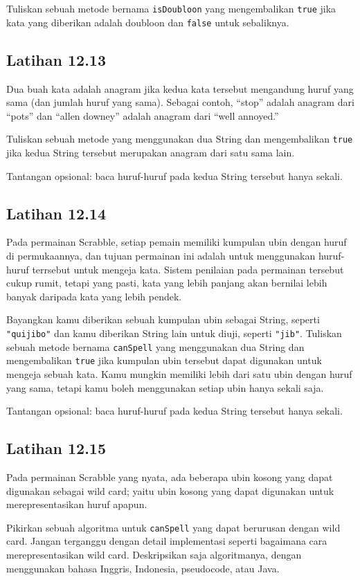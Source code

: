 Tuliskan sebuah metode bernama {\tt isDoubloon} yang mengembalikan {\tt true}
jika kata yang diberikan adalah doubloon dan {\tt false} untuk sebaliknya.



\subsection{Latihan 12.13}
Dua buah kata adalah anagram jika kedua kata tersebut mengandung huruf yang sama (dan jumlah huruf yang sama).  Sebagai contoh, ``stop'' adalah anagram dari ``pots'' dan ``allen downey'' adalah anagram dari ``well annoyed.''

Tuliskan sebuah metode yang menggunakan dua String dan mengembalikan {\tt true} jika kedua String tersebut merupakan anagram dari satu sama lain.

Tantangan opsional: baca huruf-huruf pada kedua String tersebut hanya sekali.



\subsection{Latihan 12.14}
Pada permainan Scrabble, setiap pemain memiliki kumpulan ubin dengan huruf di permukaannya, dan tujuan permainan ini adalah untuk menggunakan huruf-huruf terrsebut untuk mengeja kata. Sistem penilaian pada permainan tersebut cukup rumit, tetapi yang pasti, kata yang lebih panjang akan bernilai lebih banyak daripada kata yang lebih pendek.

Bayangkan kamu diberikan sebuah kumpulan ubin sebagai String, seperti {\tt
"quijibo"} dan kamu diberikan String lain untuk diuji, seperti {\tt "jib"}.
Tuliskan sebuah metode bernama {\tt canSpell} yang menggunakan dua String dan
mengembalikan {\tt true} jika kumpulan ubin tersebut dapat digunakan untuk mengeja sebuah kata.  Kamu mungkin memiliki lebih dari satu ubin dengan huruf yang sama, tetapi kamu boleh menggunakan setiap ubin hanya sekali saja.

Tantangan opsional: baca huruf-huruf pada kedua String tersebut hanya sekali.



\subsection{Latihan 12.15}
Pada permainan Scrabble yang nyata, ada beberapa ubin kosong yang dapat digunakan sebagai wild card; yaitu ubin kosong yang dapat digunakan untuk merepresentasikan huruf apapun.

Pikirkan sebuah algoritma untuk {\tt canSpell} yang dapat berurusan dengan wild
card.  Jangan terganggu dengan detail implementasi seperti bagaimana cara merepresentasikan wild card.  Deskripsikan saja algoritmanya, dengan menggunakan bahasa Inggris, Indonesia, pseudocode, atau Java.




